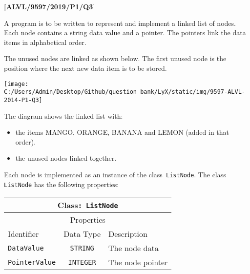 \item \textbf{{[}ALVL/9597/2019/P1/Q3{]} }

A program is to be written to represent and implement a linked list
of nodes. Each node contains a string data value and a pointer. The
pointers link the data items in alphabetical order. 

The unused nodes are linked as shown below. The first unused node
is the position where the next new data item is to be stored. 
\begin{center}
\texttt{[image: C:/Users/Admin/Desktop/Github/question\_bank/LyX/static/img/9597-ALVL-2014-P1-Q3]}
\par\end{center}

The diagram shows the linked list with: 
\begin{itemize}
\item the items MANGO, ORANGE, BANANA and LEMON (added in that order). 
\item the unused nodes linked together.
\end{itemize}
Each node is implemented as an instance of the class\texttt{ ListNode}.
The class \texttt{ListNode} has the following properties: 
\begin{center}
\begin{tabular}{|l|c|l|}
\hline 
\multicolumn{3}{|c|}{Class\texttt{: ListNode}}\tabularnewline
\hline 
\multicolumn{3}{|c|}{Properties}\tabularnewline
\hline 
\texttt{\hspace{0.01\columnwidth}}Identifier & \texttt{\hspace{0.01\columnwidth}}Data Type & \texttt{\hspace{0.01\columnwidth}}Description\tabularnewline
\hline 
\texttt{DataValue} & \texttt{STRING} & The node data\tabularnewline
\hline 
\texttt{PointerValue} & \texttt{INTEGER} & The node pointer\tabularnewline
\hline 
\end{tabular}
\par\end{center}

